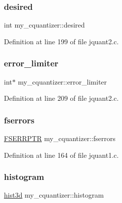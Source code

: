 \subsubsection{\texorpdfstring{desired}{desired}}
{\footnotesize\ttfamily int my\+\_\+cquantizer\+::desired}



Definition at line 199 of file jquant2.\+c.

\mbox{\label{structmy__cquantizer_a2af4df34ba2e1a9081f0dc3a661066e7}} 
\subsubsection{\texorpdfstring{error\_limiter}{error\_limiter}}
{\footnotesize\ttfamily int$\ast$ my\+\_\+cquantizer\+::error\+\_\+limiter}



Definition at line 209 of file jquant2.\+c.

\mbox{\label{structmy__cquantizer_a486b351b769e8cdfc832dc33309c7069}} 
\subsubsection{\texorpdfstring{fserrors}{fserrors}}
{\footnotesize\ttfamily \mbox{\hyperlink{jquant1_8c_a930ab0c20ada7242a123ab0f60de3c77}{F\+S\+E\+R\+R\+P\+TR}} my\+\_\+cquantizer\+::fserrors}



Definition at line 164 of file jquant1.\+c.

\mbox{\label{structmy__cquantizer_a108a22411249dc52d196fa5a1ee50173}} 
\subsubsection{\texorpdfstring{histogram}{histogram}}
{\footnotesize\ttfamily \mbox{\hyperlink{jquant2_8c_ada1687f0231a8711298a8e4741e82c16}{hist3d}} my\+\_\+cquantizer\+::histogram}



